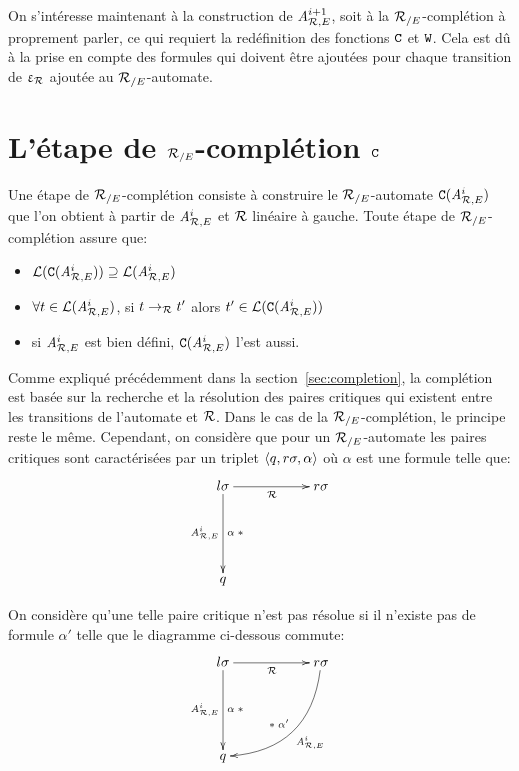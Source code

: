 On s'intéresse maintenant à la construction de ${\mathit A}_{\mathcal R,E}^{i+1}$, soit à la ${\mathcal R_{/E}}$-complétion à proprement parler, ce
qui requiert la redéfinition des fonctions $\mathtt{C}$ et $\mathtt{W}$. Cela est dû à la prise en compte des formules
qui doivent être ajoutées pour chaque transition de $\upvarepsilon_{\mathcal R}$ ajoutée au ${\mathcal R_{/E}}$-automate.


\section{L'étape de ${\mathcal R_{/E}}$-complétion $\mathtt{C}$}

Une étape de ${\mathcal R_{/E}}$-complétion consiste à construire le ${\mathcal R_{/E}}$-automate $\mathtt{C}({\mathit A}_{\mathcal R,E}^i)$ 
que l'on obtient à partir de ${\mathit A}_{\mathcal R,E}^i$ et $\mathcal R$ linéaire à gauche.
Toute étape de ${\mathcal R_{/E}}$-complétion assure que:

\begin{itemize}
\item $\mathcal{L}(\mathtt{C}({\mathit A}_{\mathcal R,E}^i)) \supseteq \mathcal{L}({\mathit A}_{\mathcal R,E}^i)$
\item $\forall t \in \mathcal{L}({\mathit A}_{\mathcal R,E}^i)$, si $t \rightarrow_\mathcal R t'$ alors $t' \in \mathcal{L}(\mathtt{C}({\mathit A}_{\mathcal R,E}^i))$
\item si ${\mathit A}_{\mathcal R,E}^i$ est bien défini, $\mathtt{C}({\mathit A}_{\mathcal R,E}^i)$ l'est aussi.
\end{itemize}


Comme expliqué précédemment dans la section~\ref{sec:completion}, la complétion est basée sur
la recherche et la résolution des paires critiques qui existent entre les transitions de l'automate 
et $\mathcal R$. Dans le cas de la ${\mathcal R_{/E}}$-complétion, le principe reste le même. Cependant, on considère
que pour un ${\mathcal R_{/E}}$-automate les paires critiques sont caractérisées par un triplet $\langle q, r\sigma, \alpha\rangle$
où $\alpha$ est une formule telle que:
  \[
  \xymatrix{
    l\sigma \ar[dd]_{\aaexeq^i}^{\alpha\; *} \ar[rr]_{\R} && r\sigma\\
    \\
    q
  }
  \]

On considère qu'une telle paire critique n'est pas résolue si il n'existe pas de formule $\alpha'$ telle que 
le diagramme ci-dessous commute:
  \[
  \xymatrix{
    l\sigma \ar[dd]_{\aaexeq^i}^{\alpha\; *} \ar[rr]_{\R} && r\sigma \ar@/^1.8pc/[ddll]_{*\; \alpha'}^{\aaexeq^i}\\
    \\
    q
  }
  \]

